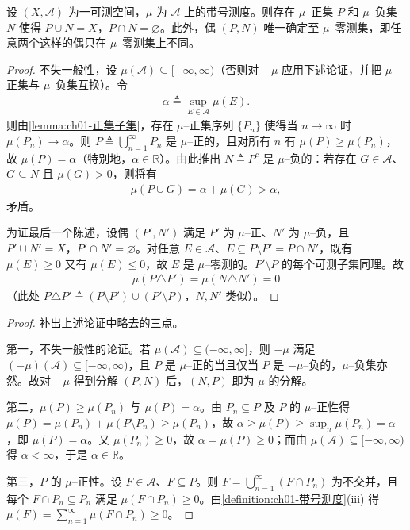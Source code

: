 \documentclass[../../main.tex]{subfiles}%
\begin{document}
\begin{theorem}[Hahn]\label{theorem:ch01-Hahn分解}
设 $(X,\mathcal{A})$ 为一可测空间，$\mu$ 为 $\mathcal{A}$ 上的带号测度。则存在 $\mu$--正集 $P$ 和 $\mu$--负集 $N$ 使得 $P\cup N=X$，$P\cap N=\varnothing$。此外，偶 $(P,N)$ 唯一确定至 $\mu$--零测集，即任意两个这样的偶只在 $\mu$--零测集上不同。
\end{theorem}

\begin{proof}
不失一般性，设 $\mu(\mathcal{A})\subseteq[-\infty,\infty)$（否则对 $-\mu$ 应用下述论证，并把 $\mu$--正集与 $\mu$--负集互换）。令
\begin{align*}
\alpha\triangleq\sup_{E\in\mathcal{A}}\mu(E).
\end{align*}
则由\cref{lemma:ch01-正集子集}，存在 $\mu$--正集序列 $\{P_n\}$ 使得当 $n\to\infty$ 时 $\mu(P_n)\to\alpha$。则 $P\triangleq\bigcup_{n=1}^\infty P_n$ 是 $\mu$--正的，且对所有 $n$ 有 $\mu(P)\geqslant\mu(P_n)$，故 $\mu(P)=\alpha$（特别地，$\alpha\in\mathbb{R}$）。由此推出 $N\triangleq P^c$ 是 $\mu$--负的：若存在 $G\in\mathcal{A}$、$G\subseteq N$ 且 $\mu(G)>0$，则将有
\begin{align*}
\mu(P\cup G)=\alpha+\mu(G)>\alpha,
\end{align*}
矛盾。

为证最后一个陈述，设偶 $(P',N')$ 满足 $P'$ 为 $\mu$--正、$N'$ 为 $\mu$--负，且 $P'\cup N'=X$，$P'\cap N'=\varnothing$。对任意 $E\in\mathcal{A}$、$E\subseteq P\setminus P'=P\cap N'$，既有 $\mu(E)\geqslant0$ 又有 $\mu(E)\leqslant0$，故 $E$ 是 $\mu$--零测的。$P'\setminus P$ 的每个可测子集同理。故
\begin{align*}
\mu(P\triangle P')=\mu(N\triangle N')=0
\end{align*}
（此处 $P\triangle P'\triangleq(P\setminus P')\cup(P'\setminus P)$，$N,N'$ 类似）。
\end{proof}

\begin{proof}
补出上述论证中略去的三点。

第一，不失一般性的论证。若 $\mu(\mathcal{A})\subseteq(-\infty,\infty]$，则 $-\mu$ 满足 $(-\mu)(\mathcal{A})\subseteq[-\infty,\infty)$，且 $P$ 是 $\mu$--正的当且仅当 $P$ 是 $-\mu$--负的，$\mu$--负集亦然。故对 $-\mu$ 得到分解 $(P,N)$ 后，$(N,P)$ 即为 $\mu$ 的分解。

第二，$\mu(P)\geqslant\mu(P_n)$ 与 $\mu(P)=\alpha$。由 $P_n\subseteq P$ 及 $P$ 的 $\mu$--正性得 $\mu(P)=\mu(P_n)+\mu(P\setminus P_n)\geqslant\mu(P_n)$，故 $\alpha\geqslant\mu(P)\geqslant\sup_n\mu(P_n)=\alpha$，即 $\mu(P)=\alpha$。又 $\mu(P_n)\geqslant0$，故 $\alpha=\mu(P)\geqslant0$；而由 $\mu(\mathcal{A})\subseteq[-\infty,\infty)$ 得 $\alpha<\infty$，于是 $\alpha\in\mathbb{R}$。

第三，$P$ 的 $\mu$--正性。设 $F\in\mathcal{A}$、$F\subseteq P$。则 $F=\bigcup_{n=1}^\infty(F\cap P_n)$ 为不交并，且每个 $F\cap P_n\subseteq P_n$ 满足 $\mu(F\cap P_n)\geqslant0$。由\cref{definition:ch01-带号测度}(iii) 得 $\mu(F)=\sum_{n=1}^\infty\mu(F\cap P_n)\geqslant0$。
\end{proof}
\end{document}
